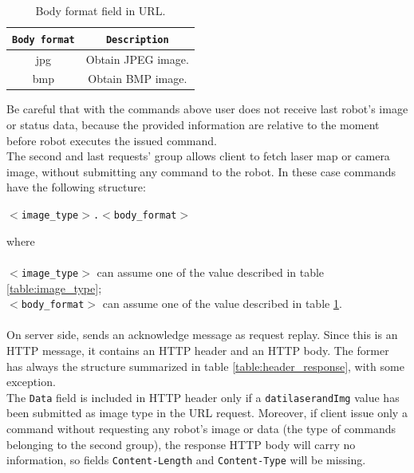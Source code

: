 \begin{table}[!h]
  \centering  
  \begin{tabular}{| c | c |}

    \hline
    \texttt{\bf Body format} &
    \texttt{\bf Description} \\ %

    \hline
    \parbox[t]{6.5cm}{\raggedright \small jpg } &
    \parbox[t]{6cm}{\raggedright \small
      Obtain JPEG image.} \\  [1ex]

    \hline
    \parbox[t]{6.5cm}{\raggedright \small bmp } &
    \parbox[t]{6cm}{\raggedright \small
      Obtain BMP image.} \\  [1ex]
    \hline

  \end{tabular}
  \caption{Body format field in URL.}
  \label{table:body_format}
\end{table}

Be careful that with the commands above user does not receive last robot's image or
status data, because the provided information are relative to the moment
before robot executes the issued command.
\\
The second and last requests' group allows client to fetch laser map or camera image,
without submitting any command to the robot. In these case commands have
the following structure:

\begin{center}
  \texttt{$<$image\_type$>$.$<$body\_format$>$}
\end{center}

where \\ \\
\texttt{$<$image\_type$>$} can assume one of the value described in table
\ref{table:image_type};\\
\texttt{$<$body\_format$>$} can assume one of the value described in table
\ref{table:body_format}. \\
\\
On server side, \morduc{} sends an acknowledge message as
request replay. Since this is an HTTP message, it contains an HTTP header and
an HTTP body. The former has always the structure summarized in table 
\ref{table:header_response}, with some exception.
\\
The \texttt{Data} field is included in HTTP header only if a \texttt{datilaserandImg}
value has been submitted as image type in the URL request. Moreover, if client
issue only a command without requesting any robot's image or data (the type
of commands belonging to the second group), the response HTTP body will carry
no information, so fields \texttt{Content-Length} and \texttt{Content-Type} will be missing.

